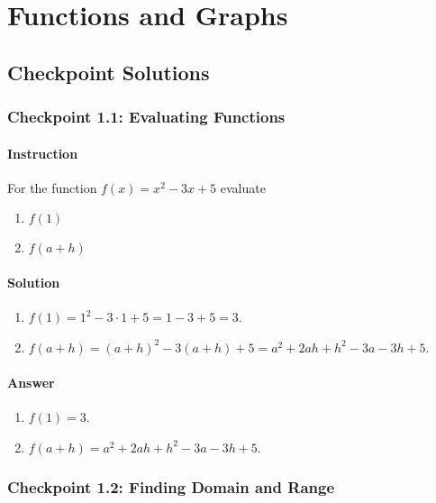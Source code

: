 \documentclass[11pt, letterpaper, oneside]{memoir}
\begin{document}
\chapter{Functions and Graphs}

\section*{Checkpoint Solutions}

\subsection*{Checkpoint 1.1: Evaluating Functions}

\subsubsection*{Instruction}

For the function $ f(x) = x^2 - 3x + 5 $ evaluate

\begin{enumerate}[label=(\alph*)]
  \item $ f(1) $
  \item $ f(a + h) $
\end{enumerate}

\subsubsection*{Solution}

\begin{enumerate}[label=(\alph*)]
  \item $ f(1) = 1 ^ 2 - 3 \cdot 1 + 5 = 1 - 3 + 5 = 3 $.
  \item $ f(a + h) = (a + h)^2 - 3(a + h) + 5 = a^2 + 2ah + h^2 - 3a - 3h + 5 $.
\end{enumerate}

\subsubsection*{Answer}

\begin{enumerate}[label=(\alph*)]
  \item $ f(1) = 3 $.
  \item $ f(a + h) = a^2 + 2ah + h^2 - 3a - 3h + 5 $.
\end{enumerate}

\subsection*{Checkpoint 1.2: Finding Domain and Range}
\end{document}
